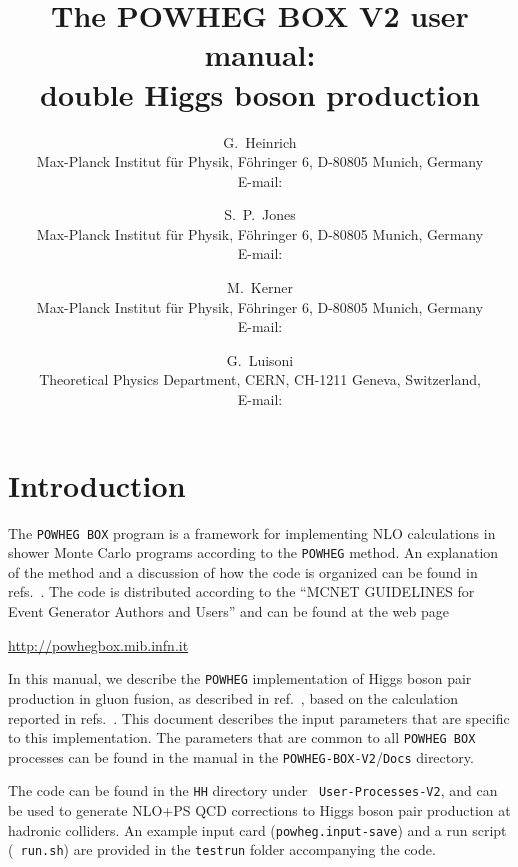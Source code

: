 \documentclass[paper]{JHEP3}
\title{The POWHEG BOX V2 user manual:\\
  double Higgs boson production} \vfill
\author{G.~Heinrich\\ 
  Max-Planck Institut f{\"u}r Physik, F\"ohringer 6, D-80805 Munich, Germany\\
  E-mail: \email{gudrun@mpp.mpg.de}
}
\author{S.~P.~Jones \\ 
  Max-Planck Institut f{\"u}r Physik, F\"ohringer 6, D-80805 Munich, Germany\\
  E-mail: \email{sjones@mpp.mpg.de}
}
\author{M.~Kerner \\ 
  Max-Planck Institut f{\"u}r Physik, F\"ohringer 6, D-80805 Munich, Germany\\
  E-mail: \email{kerner@mpp.mpg.de}
}
\author{G.~Luisoni\\
  Theoretical Physics Department, CERN, CH-1211 Geneva, Switzerland,\\
  E-mail: \email{gionata.luisoni@cern.ch}
}
\newcommand\POWHEG{{\tt POWHEG}}
\newcommand\POWHEGBOX{{\tt POWHEG BOX}}
\newcommand\POWHEGBOXV{{\tt POWHEG-BOX-V2}}
\begin{document}
\section{Introduction}

The \POWHEGBOX{} program is a framework for implementing NLO
calculations in shower Monte Carlo programs according to the \POWHEG{}
method. An explanation of the method and a discussion of how the code
is organized can be found in
refs.~\cite{Nason:2004rx,Frixione:2007vw,Alioli:2010xd,Jezo:2015aia}.
The code is distributed according to the ``MCNET GUIDELINES for Event
Generator Authors and Users'' and can be found at the web page
%
\begin{center}
 \url{http://powhegbox.mib.infn.it}
\end{center}
%
In this manual, we describe the \POWHEG{} implementation of Higgs
boson pair production in gluon fusion, as described in
ref.~\cite{Heinrich:2017kxx}, based on the calculation reported in
refs.~\cite{Borowka:2016ehy,Borowka:2016ypz}.  This document describes
the input parameters that are specific to this implementation. The
parameters that are common to all \POWHEGBOX{} processes can be found
in the manual in the \POWHEGBOXV{}/{\tt Docs} directory.

The code can be found in the {\tt HH} directory under {\tt
  User-Processes-V2}, and can be used to generate NLO+PS QCD
corrections to Higgs boson pair production at hadronic colliders. An
example input card ({\tt powheg.input-save}) and a run script ({\tt
  run.sh}) are provided in the {\tt testrun} folder accompanying the
code.
\end{document}

